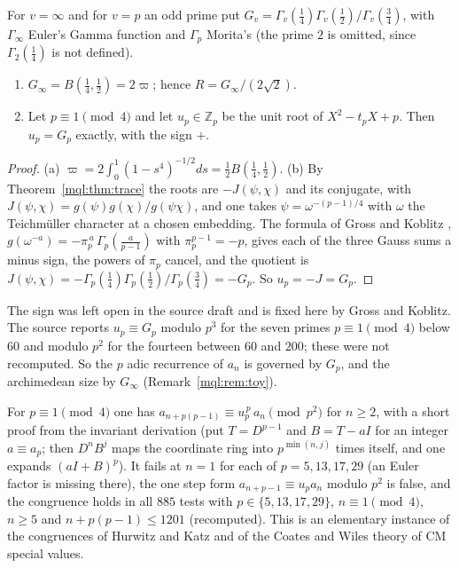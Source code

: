 \begin{theorem}\label{mql:thm:gammaprod}
For $v=\infty$ and for $v=p$ an odd prime put $G_v=\Gamma_v(\frac14)\Gamma_v(\frac12)/\Gamma_v(\frac34)$, with $\Gamma_\infty$ Euler's Gamma function and $\Gamma_p$ Morita's (the prime $2$ is omitted, since $\Gamma_2(\frac14)$ is not defined).
\begin{enumerate}
\item $G_\infty=B(\frac14,\frac12)=2\varpi$; hence $R=G_\infty/(2\sqrt2)$.
\item Let $p\equiv1\pmod4$ and let $u_p\in\mathbb Z_p$ be the unit root of $X^2-t_pX+p$. Then $u_p=G_p$ exactly, with the sign $+$.
\end{enumerate}
\end{theorem}

\begin{proof}
(a) $\varpi=2\int_0^1(1-s^4)^{-1/2}ds=\frac12B(\frac14,\frac12)$. (b) By Theorem~\ref{mql:thm:trace} the roots are $-J(\psi,\chi)$ and its conjugate, with $J(\psi,\chi)=g(\psi)g(\chi)/g(\psi\chi)$, and one takes $\psi=\omega^{-(p-1)/4}$ with $\omega$ the Teichm\"uller character at a chosen embedding. The formula of Gross and Koblitz \cite{GrossKoblitz79}, $g(\omega^{-a})=-\pi_p^{\,a}\,\Gamma_p(\frac a{p-1})$ with $\pi_p^{p-1}=-p$, gives each of the three Gauss sums a minus sign, the powers of $\pi_p$ cancel, and the quotient is $J(\psi,\chi)=-\Gamma_p(\frac14)\Gamma_p(\frac12)/\Gamma_p(\frac34)=-G_p$. So $u_p=-J=G_p$.
\end{proof}

The sign was left open in the source draft and is fixed here by Gross and Koblitz. The source reports $u_p\equiv G_p$ modulo $p^3$ for the seven primes $p\equiv1\pmod4$ below $60$ and modulo $p^2$ for the fourteen between $60$ and $200$; these were not recomputed. So the $p$ adic recurrence of $a_n$ is governed by $G_p$, and the archimedean size by $G_\infty$ (Remark~\ref{mql:rem:toy}).

\begin{remark}\label{mql:rem:kummer2}
For $p\equiv1\pmod4$ one has $a_{n+p(p-1)}\equiv u_p^{\,p}\,a_n\pmod{p^2}$ for $n\ge2$, with a short proof from the invariant derivation (put $T=D^{p-1}$ and $B=T-aI$ for an integer $a\equiv a_p$; then $D^nB^j$ maps the coordinate ring into $p^{\min(n,j)}$ times itself, and one expands $(aI+B)^p$). It fails at $n=1$ for each of $p=5,13,17,29$ (an Euler factor is missing there), the one step form $a_{n+p-1}\equiv u_pa_n$ modulo $p^2$ is false, and the congruence holds in all $885$ tests with $p\in\{5,13,17,29\}$, $n\equiv1\pmod4$, $n\ge5$ and $n+p(p-1)\le1201$ (recomputed). This is an elementary instance of the congruences of Hurwitz and Katz and of the Coates and Wiles theory of CM special values.
\end{remark}

